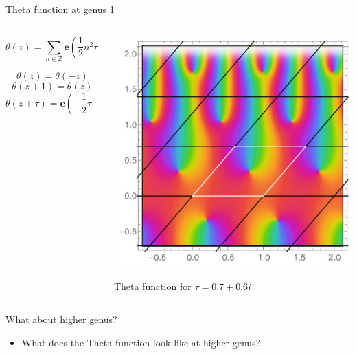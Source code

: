 \documentclass[11pt,aspectratio=169]{beamer}
\newcommand{\ee}[0]{\mathbf{e}}
\begin{document}
\begin{frame}{Theta function at genus 1}
    \begin{columns}[onlytextwidth]
        \begin{column}{0.55\textwidth}
            \[\theta(z) = \sum_{n \in \mathbb Z} \ee\left(\frac{1}{2}n^2 \tau + n z\right)\]

            \[\theta(z)=\theta(-z)\]
            \[\theta(z+1)=\theta(z)\]
            \[\theta(z+\tau)=\ee\left(-\frac{1}{2}\tau-z\right)\theta(z)\]
        \end{column}
        \begin{column}{0.45\textwidth}
            \center{}
            \includegraphics[width=0.7\columnwidth]{assets/genus1theta.png}

            \tiny Theta function for $\tau = 0.7+0.6i$
            
            \cite{Cha22}
        \end{column}
    \end{columns}


    {
    \begin{block}{What about higher genus?}
        \begin{itemize}
            \item What does the Theta function look like at higher genus?
        \end{itemize}
    \end{block}
    }
\end{frame}
\end{document}

